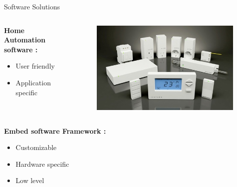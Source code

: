 \documentclass{beamer}
\begin{document}
\begin{frame}{Software Solutions}
\begin{columns}
\begin{column}[l]{0.5\textwidth}
\textbf{Home Automation software :}
\begin{itemize}
\item[\Large\smiley] User friendly
\item[\Large\frownie] Application specific

\end{itemize}
\end{column}
\begin{column}[r]{0.5\textwidth}
\begin{figure}
\includegraphics[width=\columnwidth]{./figures/Home-Automation-Products.jpg}
\end{figure}
\end{column}
\end{columns}

\begin{columns}
\begin{column}[l]{0.5\textwidth}
\textbf{Embed software Framework  :}
\begin{itemize}
\item[\Large\smiley] Customizable

\item[\Large\frownie] Hardware specific
\item[\Large\frownie] Low level


\end{itemize}
\end{column}
\end{columns}
\end{frame}
\end{document}
